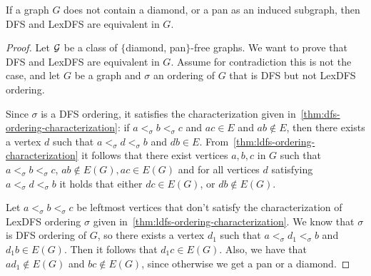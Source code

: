 \documentclass{svproc}
\begin{document}
\begin{lemma}
If a graph $G$ does not contain a diamond, or a pan as an induced subgraph, then DFS and LexDFS are equivalent in $G$.
\end{lemma}
\begin{proof}

Let ${\cal G}$ be a class of $\{$diamond, pan$\}$-free graphs. We want to prove that DFS and LexDFS are equivalent in $G$. Assume for contradiction this is not the case, and let $G$ be a graph and $\sigma $ an ordering of $G$ that is DFS but not LexDFS ordering. 

Since $\sigma$ is a DFS ordering, it satisfies the characterization given in~\cref{thm:dfs-ordering-characterization}: if $ a <_\sigma b <_\sigma c$ and $ac \in E$ and $ab \notin E$, then there exists a vertex $d$ such that $a<_\sigma d <_\sigma b$ and $db \in E$.
From~\cref{thm:ldfs-ordering-characterization} 
it follows that there exist vertices $a,b,c$ in $G$ such that $a<_\sigma b<_\sigma c$, $ab\notin E(G), ac\in E(G)$ and for all vertices $d$ satisfying $a<_\sigma d<_\sigma b$ it holds that either $dc\in E(G)$, or $db\notin E(G)$.
 

Let $a<_\sigma b<_\sigma c$ be leftmost vertices that don't satisfy the characterization of LexDFS ordering $\sigma$ given in~\cref{thm:ldfs-ordering-characterization}. We know that $\sigma$ is DFS ordering of $G$, so there exists a vertex $d_1$ such that $a<_\sigma d_1<_\sigma b$ and $d_1b\in E(G)$. Then it follows that $d_1c\in E(G)$. 
Also, we have that $ad_1\notin E(G)$ and $bc\notin E(G)$, since otherwise we get a pan or a diamond. 


\end{proof}
\end{document}
